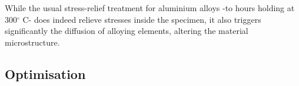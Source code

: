 While the usual stress-relief treatment for aluminium alloys -to hours holding at 300$^\circ$ C- does indeed relieve stresses inside the specimen, it also triggers significantly the diffusion of alloying elements, altering the material microstructure.

\subsection{Optimisation}



